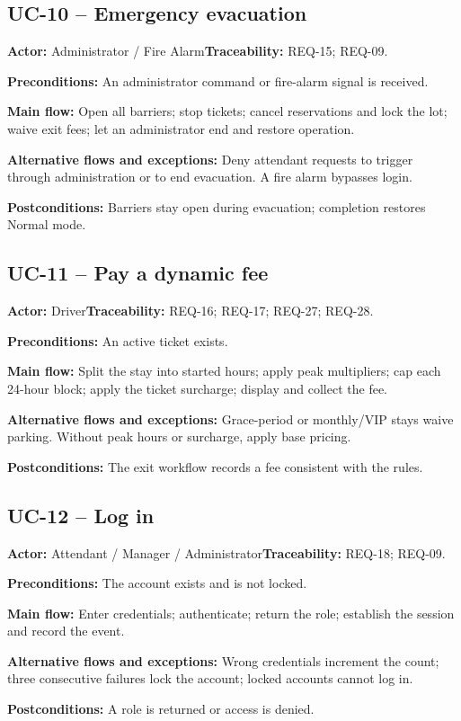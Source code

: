 \subsection{UC-10 -- Emergency evacuation}
\noindent\textbf{Actor:} Administrator / Fire Alarm\quad\textbf{Traceability:} REQ-15; REQ-09.
\par\textbf{Preconditions:} An administrator command or fire-alarm signal is received.
\par\textbf{Main flow:} Open all barriers; stop tickets; cancel reservations and lock the lot; waive exit fees; let an administrator end and restore operation.
\par\textbf{Alternative flows and exceptions:} Deny attendant requests to trigger through administration or to end evacuation. A fire alarm bypasses login.
\par\textbf{Postconditions:} Barriers stay open during evacuation; completion restores Normal mode.
\subsection{UC-11 -- Pay a dynamic fee}
\noindent\textbf{Actor:} Driver\quad\textbf{Traceability:} REQ-16; REQ-17; REQ-27; REQ-28.
\par\textbf{Preconditions:} An active ticket exists.
\par\textbf{Main flow:} Split the stay into started hours; apply peak multipliers; cap each 24-hour block; apply the ticket surcharge; display and collect the fee.
\par\textbf{Alternative flows and exceptions:} Grace-period or monthly/VIP stays waive parking. Without peak hours or surcharge, apply base pricing.
\par\textbf{Postconditions:} The exit workflow records a fee consistent with the rules.
\subsection{UC-12 -- Log in}
\noindent\textbf{Actor:} Attendant / Manager / Administrator\quad\textbf{Traceability:} REQ-18; REQ-09.
\par\textbf{Preconditions:} The account exists and is not locked.
\par\textbf{Main flow:} Enter credentials; authenticate; return the role; establish the session and record the event.
\par\textbf{Alternative flows and exceptions:} Wrong credentials increment the count; three consecutive failures lock the account; locked accounts cannot log in.
\par\textbf{Postconditions:} A role is returned or access is denied.

